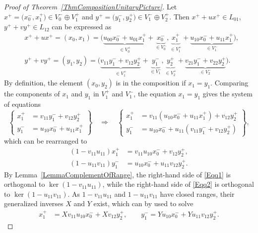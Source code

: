 \documentclass[pdftex]{sigma}
\numberwithin{equation}{section}
\begin{document}
\begin{proof}[Proof of Theorem~\ref{ThmCompositionUnitaryPicture}]
Let $x^+ = \big(x_0^-, x_1^+\big) \in V_0^- \oplus V_1^+$ and $y^+ = \big(y_1^-, y_2^+\big) \in V_1^-\oplus V_2^+$.
Then $x^+ + ux^+ \in L_{01}$, $y^+ +vy^+ \in L_{12}$ can be expressed as
\begin{align}
& x^++ux^+= (x_0, x_1) = \big(\underbrace{u_{00} x_0^- + u_{01}x_1^+}_{ \in V_0^+} + \underbrace{x_0^-}_{\in V_0^-}, \underbrace{x_1^+}_{\in V_1^+} + \underbrace{u_{10} x_0^- + u_{11} x_1^+}_{\in V_1^-}\big),\nonumber\\
&y^++vy^+= (y_1, y_2) = \big(\underbrace{v_{11} y_1^- + v_{12}y_2^+}_{ \in V_1^+} + \underbrace{y_1^-}_{\in V_1^-}, \underbrace{y_2^+}_{\in V_2^+} + \underbrace{v_{21} y_1^- + v_{22} y_2^+}_{\in V_2^-}\big).\label{ElementsOfComposition}
\end{align}
By definition, the element $(x_0, y_2)$ is in the composition if $x_1 = y_1$.
Comparing the components of $x_1$ and $y_1$ in $V_1^+$ and $V_1^-$, the equation $x_1 = y_1$ gives the system of equations
\begin{equation*}
\left\{\begin{aligned}
x_1^+ &= v_{11} y_1^- + v_{12}y_2^+\\
y_1^- &= u_{10} x_0^- + u_{11} x_1^+
\end{aligned}\right\}
\quad \Longrightarrow \quad
\left\{\begin{aligned}
x_1^+ &= v_{11} (u_{10} x_0^- + u_{11} x_1^+) + v_{12}y_2^+\\
y_1^- &= u_{10} x_0^- + u_{11} ( v_{11} y_1^- + v_{12}y_2^+)
\end{aligned}\right\},
\end{equation*}
which can be rearranged to
\begin{align}
(1- v_{11}u_{11})x_1^+ &= v_{11} u_{10} x_0^- + v_{12}y_2^+, \label{Eqq1}\\
(1-u_{11}v_{11})y_1^- &= u_{10} x_0^- + u_{11}v_{12}y_2^+.\label{Eqq2}
\end{align}
By Lemma~\ref{LemmaComplementOfRange}, the right-hand side of \eqref{Eqq1} is orthogonal to $\ker(1- v_{11}u_{11})$, while the right-hand side of \eqref{Eqq2} is orthogonal to $\ker(1- u_{11}v_{11})$.
As $1- v_{11}u_{11}$ and $1-u_{11}v_{11}$ have closed ranges, their generalized inverses $X$ and $Y$ exist, which can by used to solve
 \begin{align}
x_1^+ &= Xv_{11} u_{10} x_0^- + Xv_{12}y_2^+,\qquad
y_1^- = Yu_{10} x_0^- + Yu_{11}v_{12}y_2^+.\label{Solutionx1y1}
\end{align}

\end{proof}
\end{document}
